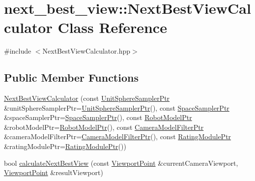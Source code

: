 \hypertarget{classnext__best__view_1_1NextBestViewCalculator}{\section{next\-\_\-best\-\_\-view\-:\-:\-Next\-Best\-View\-Calculator \-Class \-Reference}
\label{classnext__best__view_1_1NextBestViewCalculator}
}


{\ttfamily \#include $<$\-Next\-Best\-View\-Calculator.\-hpp$>$}

\subsection*{\-Public \-Member \-Functions}
\begin{DoxyCompactItemize}
\item 
\hyperlink{classnext__best__view_1_1NextBestViewCalculator_a94c4f7c92d2d77aecf544e4f3a624fac}{\-Next\-Best\-View\-Calculator} (const \hyperlink{namespacenext__best__view_ad3328c7d2bb2185c972df039061ad6f5}{\-Unit\-Sphere\-Sampler\-Ptr} \&unit\-Sphere\-Sampler\-Ptr=\hyperlink{namespacenext__best__view_ad3328c7d2bb2185c972df039061ad6f5}{\-Unit\-Sphere\-Sampler\-Ptr}(), const \hyperlink{namespacenext__best__view_af3d0f8204bad3e34940c86ba619815cc}{\-Space\-Sampler\-Ptr} \&space\-Sampler\-Ptr=\hyperlink{namespacenext__best__view_af3d0f8204bad3e34940c86ba619815cc}{\-Space\-Sampler\-Ptr}(), const \hyperlink{namespacenext__best__view_ad248a43c564dbbea474aa87f0fb56b22}{\-Robot\-Model\-Ptr} \&robot\-Model\-Ptr=\hyperlink{namespacenext__best__view_ad248a43c564dbbea474aa87f0fb56b22}{\-Robot\-Model\-Ptr}(), const \hyperlink{namespacenext__best__view_a75c548145a1fdcdc491efbda66e9f440}{\-Camera\-Model\-Filter\-Ptr} \&camera\-Model\-Filter\-Ptr=\hyperlink{namespacenext__best__view_a75c548145a1fdcdc491efbda66e9f440}{\-Camera\-Model\-Filter\-Ptr}(), const \hyperlink{namespacenext__best__view_a0fd3a238157d0632d802531f590682ec}{\-Rating\-Module\-Ptr} \&rating\-Module\-Ptr=\hyperlink{namespacenext__best__view_a0fd3a238157d0632d802531f590682ec}{\-Rating\-Module\-Ptr}())
\item 
bool \hyperlink{classnext__best__view_1_1NextBestViewCalculator_ad10c898d341188d3b2dc3a2b0acc61b3}{calculate\-Next\-Best\-View} (const \hyperlink{namespacenext__best__view_adc2a48dc71f39dea04334b16d75a8e34}{\-Viewport\-Point} \&current\-Camera\-Viewport, \hyperlink{namespacenext__best__view_adc2a48dc71f39dea04334b16d75a8e34}{\-Viewport\-Point} \&result\-Viewport)

\end{DoxyCompactItemize}
